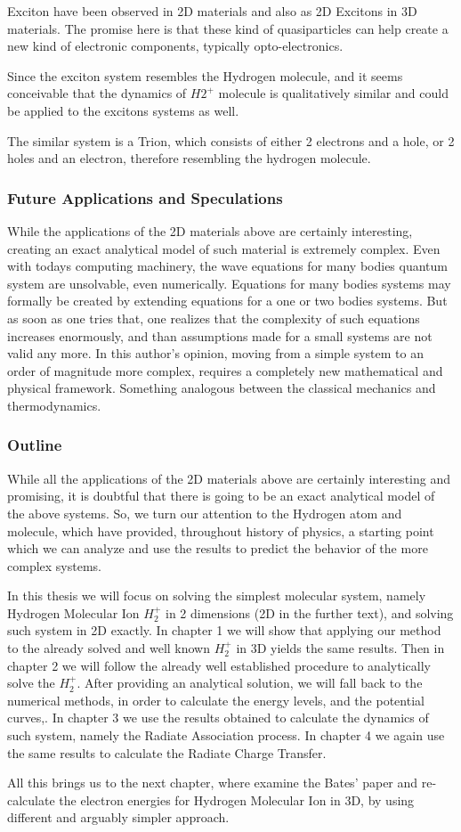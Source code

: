 Exciton have been observed in 2D materials \cite{Excitons2D1, Excitons2D2} and also as 2D Excitons in 3D materials. The promise here is that these kind of quasiparticles can help create a new kind of electronic components, typically opto-electronics.

Since the exciton system resembles the Hydrogen molecule, and it seems conceivable that the dynamics of  $ H2^{+} $ molecule is qualitatively similar and could be applied to the excitons systems as well.

The similar system is a Trion, which consists of either 2 electrons and a hole, or 2 holes and an electron, therefore resembling the hydrogen molecule.

\subsubsection{Future Applications and Speculations}

While the applications of the 2D materials above are certainly interesting, creating an exact analytical  model of such material is extremely complex. Even with todays computing machinery, the wave equations for many bodies quantum system are unsolvable, even numerically.  Equations for many bodies systems may formally be created by extending equations for a one or two bodies systems. But as soon as one tries that, one realizes that the complexity of such equations increases enormously, and than assumptions  made for a small systems are not valid any more. In this author's opinion, moving from a simple system to an order of magnitude more complex, requires a completely new mathematical and physical framework. Something analogous between the classical mechanics and thermodynamics.

\subsubsection{Outline}

While all the applications of the 2D materials above are certainly interesting and promising, it is doubtful that there is going to be an exact analytical model of the above systems. So, we turn our attention to the Hydrogen atom and molecule, which have provided, throughout history of physics, a starting point which we can analyze and use the results to predict the behavior of the more complex systems. 

In this thesis we will focus on solving the simplest molecular system, namely Hydrogen Molecular Ion $ {H_2^{+}}  $ in 2 dimensions (2D in the further text), and solving such system in 2D exactly.  In chapter 1 we will show that applying our method to the already solved and well known $ {H_2^{+}} $ in 3D yields the same results. Then in chapter 2 we will follow  the already well established procedure \cite{Bates1} to analytically solve the $ {H_2^{+}} $. After providing an analytical solution, we will fall back to the numerical methods, in order to calculate the energy levels, and the potential curves,. In chapter 3 we use the results obtained to calculate the dynamics of such system, namely the Radiate Association process. In chapter 4 we again use the same results to calculate the Radiate Charge Transfer. 

All this brings us to the next chapter, where examine the Bates' paper and re-calculate the electron energies for Hydrogen Molecular Ion in 3D, by using different and arguably simpler approach.

